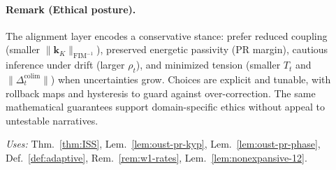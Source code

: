 \documentclass[10pt]{article}
\newcommand{\FIM}{\mathrm{FIM}}
\newcommand{\uses}[1]{\par\smallskip\noindent\textit{Uses: }#1\par\smallskip}
\begin{document}
\paragraph{Remark (Ethical posture).} The alignment layer encodes a conservative stance: prefer reduced coupling (smaller $\|\mathbf k_K\|_{\FIM^{-1}}$), preserved energetic passivity (PR margin), cautious inference under drift (larger $\rho_t$), and minimized tension (smaller $T_t$ and $\|\Delta^{\mathrm{colim}}_t\|$) when uncertainties grow. Choices are explicit and tunable, with rollback maps and hysteresis to guard against over-correction. The same mathematical guarantees support domain-specific ethics without appeal to untestable narratives.

\uses{Thm.~\ref{thm:ISS}, Lem.~\ref{lem:oust-pr-kyp}, Lem.~\ref{lem:oust-pr-phase}, Def.~\ref{def:adaptive}, Rem.~\ref{rem:w1-rates}, Lem.~\ref{lem:nonexpansive-12}.}
\end{document}

